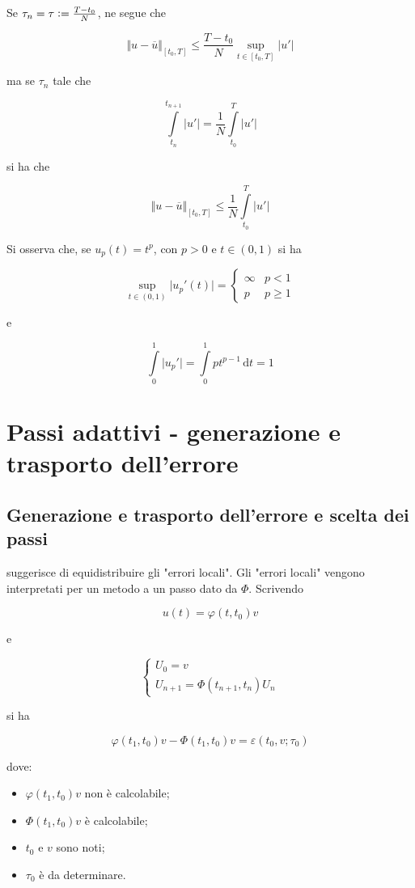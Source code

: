 \documentclass[hidelinks, 10pt]{report}
\begin{document}
Se $ \tau_{n} = \tau \vcentcolon= \frac{T - t_{0}}{N} $, ne segue che

\[ \Vert u - \overline{u} \Vert_{[t_{0}, T]} \le \frac{T - t_{0}}{N} \sup\limits_{t \in [t_{0}, T]} \vert u' \vert \]

ma se $ \tau_{n} $ tale che

\[ \int\limits_{t_{n}}^{t_{n + 1}} \vert u' \vert = \frac{1}{N} \int\limits_{t_{0}}^{T} \vert u' \vert \]

si ha che

\[ \Vert u - \overline{u} \Vert_{[t_{0}, T]} \le \frac{1}{N} \int\limits_{t_{0}}^{T} \vert u' \vert \]

Si osserva che, se $ u_{p} (t) = t^{p} $, con $ p > 0 $ e $ t \in (0, 1) $ si ha

\[ \sup\limits_{t \in (0, 1)} \vert u_{p}' (t) \vert = \begin{cases} \infty & p < 1 \\ p & p \ge 1 \end{cases} \]

e

\[ \int\limits_{0}^{1} \vert u_{p}' \vert = \int\limits_{0}^{1} p t^{p - 1} \, \mathrm{d}t = 1 \]

\section{Passi adattivi - generazione e trasporto dell'errore}
\subsection{Generazione e trasporto dell'errore e scelta dei passi}

 suggerisce di equidistribuire gli "errori locali". Gli "errori locali" vengono interpretati per un metodo a un passo dato da $ \Phi $. Scrivendo

\[ u(t) = \varphi(t, t_{0}) v \]

e

\[
\begin{cases}
U_{0} = v \\
U_{n + 1} = \Phi(t_{n + 1}, t_{n}) U_{n}
\end{cases}
\]

si ha

\[ \varphi(t_{1}, t_{0}) v - \Phi(t_{1}, t_{0}) v = \varepsilon(t_{0}, v; \tau_{0}) \]

dove:
\begin{itemize}
\item $ \varphi(t_{1}, t_{0}) v $ non \`e calcolabile;
\item $ \Phi(t_{1}, t_{0}) v $ \`e calcolabile;
\item $ t_{0} $ e $ v $ sono noti;
\item $ \tau_{0} $ \`e da determinare.
\end{itemize}
\end{document}
